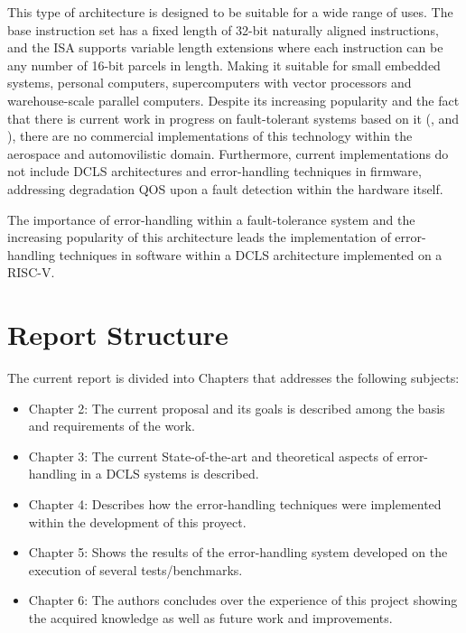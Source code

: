 \documentclass[10pt, a4paper]{report}
\begin{document}
This type of architecture is designed to be suitable for a wide range of uses.
The base instruction set has a fixed length of 32-bit naturally aligned
instructions, and the \acrshort{ISA} supports variable length extensions where
each instruction can be any number of 16-bit parcels in length. Making it
suitable for small embedded systems, personal computers, supercomputers with
vector processors and warehouse-scale parallel computers. Despite its increasing
popularity and the fact that there is current work in progress on fault-tolerant
systems based on it (\cite{soft_core_riscv_sram_radiation}, 
\cite{heterogeneus_fault_tolerance_riscv} and 
\cite{low_cost_fault_tolerant_riscv}), there are no commercial implementations 
of this technology within the aerospace and automovilistic domain. Furthermore,
current implementations do not include \acrshort{DCLS} architectures and
error-handling techniques in firmware, addressing degradation \acrshort{QOS}
upon a fault detection within the hardware itself.

The importance of error-handling within a fault-tolerance system and the
increasing popularity of this architecture leads the implementation of
error-handling techniques in software within a \acrshort{DCLS} architecture
implemented on a RISC-V.

\section{Report Structure}

The current report is divided into Chapters that addresses the following
subjects:

\begin{itemize}
    \item Chapter 2: The current proposal and its goals is described among the
        basis and requirements of the work.
    \item Chapter 3: The current State-of-the-art and theoretical aspects of 
        error-handling in a \acrshort{DCLS} systems is described.
    \item Chapter 4: Describes how the error-handling techniques were
        implemented within the development of this proyect.
    \item Chapter 5: Shows the results of the error-handling system developed on
        the execution of several tests/benchmarks.
    \item Chapter 6: The authors concludes over the experience of this project
        showing the acquired knowledge as well as future work and improvements.
\end{itemize}
\end{document}

